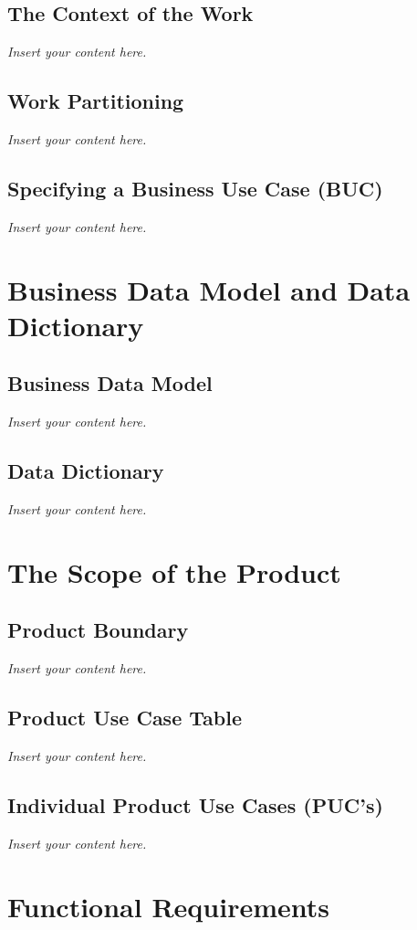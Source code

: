 \documentclass[12pt]{article}
\newcommand{\lips}{\textit{Insert your content here.}}
\begin{document}
\subsection{The Context of the Work}
\lips
\subsection{Work Partitioning}
\lips
\subsection{Specifying a Business Use Case (BUC)}
\lips

\section{Business Data Model and Data Dictionary}
\subsection{Business Data Model}
\lips
\subsection{Data Dictionary}
\lips

\section{The Scope of the Product}
\subsection{Product Boundary}
\lips
\subsection{Product Use Case Table}
\lips
\subsection{Individual Product Use Cases (PUC's)}
\lips

\section{Functional Requirements}
\end{document}
